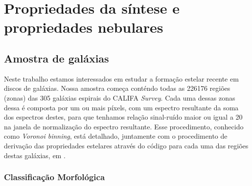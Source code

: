 


\chapter{Propriedades da síntese e propriedades nebulares}
\label{sec:synvsneb}

\section{Amostra de galáxias}
\label{sec:synvsneb:amostra}

Neste trabalho estamos interessados em estudar a formação estelar recente em discos de galáxias.
Nossa amostra começa conténdo todas as 226176 regiões (zonas) das 305 galáxias espirais do CALIFA
{\em Survey}. Cada uma dessas zonas dessa é composta por um ou mais píxels, com um espectro
resultante da soma dos espectros destes, para que tenhamos relação sinal-ruído maior ou igual a 20
na janela de normalização do espectro resultante. Esse procedimento, conhecido como {\em Voronoi
binning}, está detalhado, juntamente com o procedimento de derivação das propriedades estelares
através do código \starlight para cada uma das regiões destas galáxias, em
\citet{CidFernandes.etal.2013a}.

\subsection{Classificação Morfológica}
\label{sec:synvsneb:amostra:morf}

